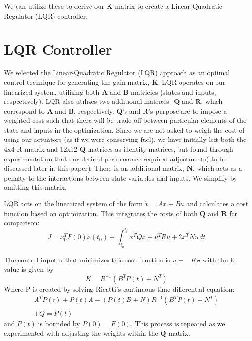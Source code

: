 \documentclass{article}
\begin{document}
\begin{multicols}{2}
We can utilize these to derive our $\boldsymbol{K}$ matrix to create a Linear-Quadratic Regulator (LQR) controller.

\section*{LQR Controller}
We selected the Linear-Quadratic Regulator (LQR) approach as an optimal control technique for generating the gain matrix, $
\boldsymbol{K}$.  LQR operates on our linearized system, utilizing both $\boldsymbol{A}$ and $\boldsymbol{B}$ matricies (states 
and inputs, respectively). LQR also utilizes two additional matrices- $\boldsymbol{Q}$ and $\boldsymbol{R}$, which correspond to $
\boldsymbol{A}$ and $\boldsymbol{B}$, respectively. $\boldsymbol{Q}$'s and $\boldsymbol{R}$'s purpose are to impose a weighted 
cost such that there will be trade off between particular elements of the state and inputs in the optimization. Since we are not asked 
to weigh the cost of using our actuators (as if we were conserving fuel), we have initially left both the  4x4 $\boldsymbol{R}$ matrix 
and 12x12 $\boldsymbol{Q}$ matrices as identity matrices, but found through experimentation that our 
desired performance required adjustments( to be discussed later in this paper). There is an additional matrix, $\boldsymbol{N}$, 
which acts as a penalty to the interactions between state variables and inputs.  We simplify by omitting this matrix.

LQR acts on the linearized system of the form $\dot{x} = Ax + Bu$ and calculates a cost function based on optimization.  This 
integrates the costs of both $\boldsymbol{Q}$ and $\boldsymbol{R}$ for comparison:
\begin{equation}
J =x_0^TF(0)x(t_0) +  \int_{t_0}^{t_f} x^TQx+u^TRu +2x^TNu\,dt 
\end{equation}

The control input u that minimizes this cost function is $u= -Kx$ with the K value is given by
\begin{equation}
K = R^{-1}(B^TP(t) + N^T)
\end{equation}
\noindent
Where P is created by solving Ricatti's continuous time differential equation:
\begin{align}
A^TP(t) + P(t)A - (P(t)B + N)R^{-1}(B^TP(t) + N^T) \nonumber\\+ Q = \dot{P}(t)
\end{align}
\noindent
and $P(t)$ is bounded by $P(0) = F(0)$. This process is repeated as we experimented with adjusting the weights within the $
\boldsymbol{Q}$ matrix.


\end{multicols}
\end{document}
